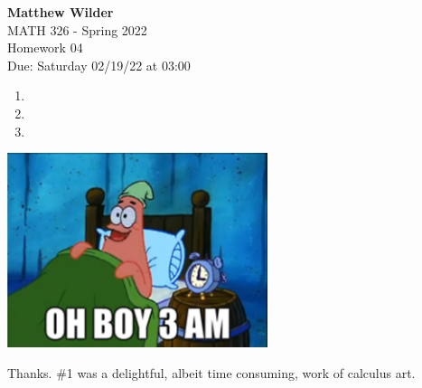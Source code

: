 \documentclass[12pt]{article}
\begin{document}
\pagestyle{fancy}
\fancyhf{}

\noindent \textbf{Matthew Wilder}\\MATH 326 - Spring 2022 \\
Homework 04\\
Due: Saturday 02/19/22 at 03:00\\

\begin{enumerate}
    \item \newpage
    \item \newpage
    \item 
\end{enumerate}
\begin{center}
    \includegraphics[width=3in]{3am.png}\end{center}

    \begin{center}Thanks. \#1 was a delightful, albeit time consuming, work of calculus art.
    \end{center}
\end{document}
